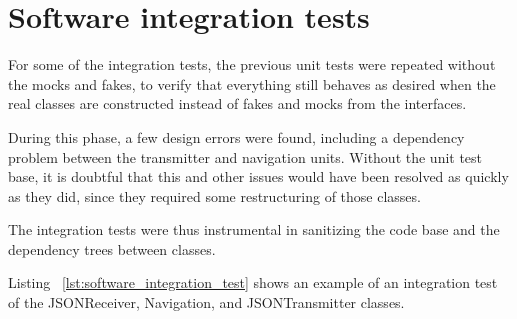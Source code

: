 \section{Software integration tests}
\label{sec:software_int}

For some of the integration tests, the previous unit tests were repeated without the mocks and fakes, to verify that everything still behaves as desired when the real classes are constructed instead of fakes and mocks from the interfaces.

During this phase, a few design errors were found, including a dependency problem between the transmitter and navigation units. Without the unit test base, it is doubtful that this and other issues would have been resolved as quickly as they did, since they required some restructuring of those classes. 

The integration tests were thus instrumental in sanitizing the code base and the dependency trees between classes.

Listing ~\ref{lst:software_integration_test} shows an example of an integration test of the JSONReceiver, Navigation, and JSONTransmitter classes.

